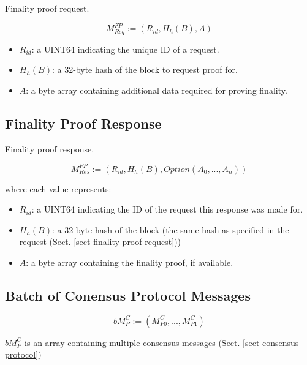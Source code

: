 \documentclass{book}
\begin{document}
Finality proof request.

\[
    M^{FP}_{Req} := (R_{id}, H_h(B), A)
\]

\begin{itemize}
    \item $R_{id}$: a UINT64 indicating the unique ID of a request.
    \item $H_h(B)$: a 32-byte hash of the block to request proof for.
    \item $A$: a byte array containing additional data required for proving finality.
\end{itemize}

\subsection{Finality Proof Response}

Finality proof response.

\[
    M^{FP}_{Res} := (R_{id}, H_h(B), Option(A_0, ..., A_n))
\]

where each value represents:

\begin{itemize}
    \item $R_{id}$: a UINT64 indicating the ID of the request this response was
    made for.
    \item $H_h(B)$: a 32-byte hash of the block (the same hash as specified in the request (Sect. \ref{sect-finality-proof-request}))
    \item $A$: a byte array containing the finality proof, if available.
\end{itemize}

\subsection{Batch of Conensus Protocol Messages}

\[
    bM^C_P := (M^C_{P0}, ..., M^C_{P1})
\]

$bM^C_P$ is an array containing multiple consensus messages (Sect. \ref{sect-consensus-protocol})
\end{document}
